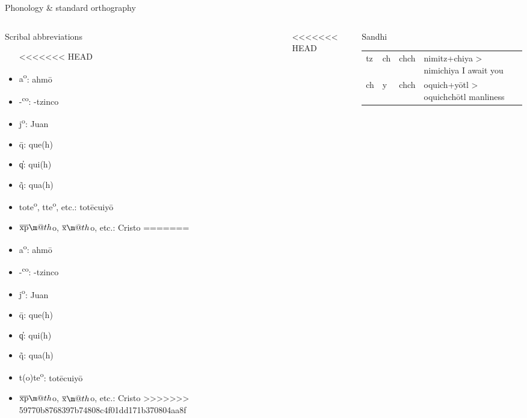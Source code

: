 \documentclass[12pt]{beamer}
\makeatletter
\newcommand*{\textoverline}[1]{$\overline{\hbox{#1}}\m@th$}
\newcommand{\nah}[1]{\textcolor{nahgrn}{#1}}
\newcommand{\trs}[1]{\textcolor{nahblu}{#1}}
\makeatother
\begin{document}
\begin{frame}
\begin{columns}[t]
\begin{column}{.22\linewidth}
\begin{block}{Phonology \& standard orthography}
\begin{threeparttable}
\begin{tablenotes}
\begin{frame}
\begin{columns}[t]
\begin{column}{.23\linewidth}
\begin{block}{Scribal abbreviations}
        \begin{multicols}{2}
          \begin{itemize}
<<<<<<< HEAD
          \item \nah{a\textsuperscript{o}}: \nah{ahmō}
          \item \nah{-\textsuperscript{co}}: \nah{-tzinco}
          \item \nah{j\textsuperscript{o}}: \nah{Juan}
          \item \nah{\={q}}: \nah{que(h)}
          \item \nah{‍q̓}: \nah{qui(h)}
          \item \nah{\~{q}}: \nah{qua(h)}
          \item \nah{tote\textsuperscript{o}, tte\textsuperscript{o}}, etc.: \nah{totēcuiyō}

          \item \nah{\textoverline{xp}o, \textoverline{x}o}, etc.: \nah{Cristo}
=======
            \item \nah{a\textsuperscript{o}}: \nah{ahmō}
            \item \nah{-\textsuperscript{co}}: \nah{-tzinco}
            \item \nah{j\textsuperscript{o}}: \nah{Juan}
            \item \nah{\={q}}: \nah{que(h)}
            \item \nah{‍q̓}: \nah{qui(h)}
            \item \nah{\~{q}}: \nah{qua(h)}
            \item \nah{t(o)te\textsuperscript{o}}: \nah{totēcuiyō}
            \item \nah{\textoverline{xp}o, \textoverline{x}o}, etc.: \nah{Cristo}
>>>>>>> 59770b8768397b74808c4f01dd171b370804aa8f
          \end{itemize}
        \end{multicols}
      \end{block}
    \end{column}
<<<<<<< HEAD
    \begin{column}{.25\linewidth}
      \begin{block}{Sandhi}
        \begin{threeparttable}
          \begin{tabular}{l@{+}l@{>}ll}
            \nah{tz} & \nah{ch} & \nah{chch}\tnote{1} & \nah{nimitz}+\nah{chiya} > \nah{nimichiya} \trs{I await you} \\
            \nah{ch} & \nah{y} & \nah{chch}\tnote{1} & \nah{oquich}+\nah{yōtl} > \nah{oquichchōtl} \trs{manliness} \\

\end{tabular}
\end{threeparttable}
\end{block}
\end{column}
\end{columns}
\end{frame}
\end{tablenotes}
\end{threeparttable}
\end{block}
\end{column}
\end{columns}
\end{frame}
\end{document}

